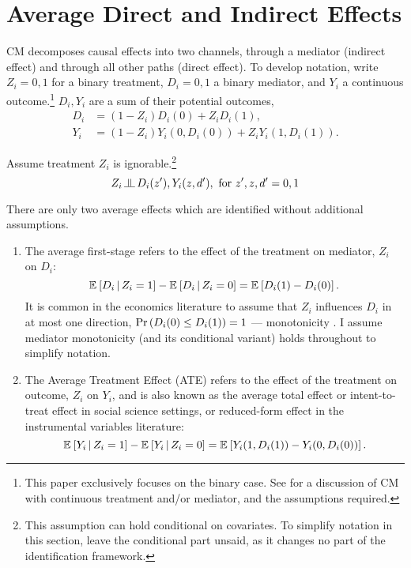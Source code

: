 \section{Average Direct and Indirect Effects}
\label{sec:mediation}
CM decomposes causal effects into two channels, through a mediator (indirect effect) and through all other paths (direct effect).
To develop notation, write $Z_i = 0, 1$ for a binary treatment, $D_i = 0, 1$ a binary mediator, and $Y_i$ a continuous outcome.\footnote{
    This paper exclusively focuses on the binary case.
    See \cite{huber2020direct} for a discussion of CM with continuous treatment and/or mediator, and the assumptions required.
}
$D_i, Y_i$ are a sum of their potential outcomes,
\begin{align*}
    D_i &= (1 - Z_i) D_i(0)
        +   Z_i      D_i(1),  \\
    Y_i &= (1 - Z_i) Y_i(0, D_i(0))
        +   Z_i      Y_i(1, D_i(1)).
\end{align*}

Assume treatment $Z_i$ is ignorable.\footnote{
    This assumption can hold conditional on covariates.
    To simplify notation in this section, leave the conditional part unsaid, as it changes no part of the identification framework.
}
\[ Z_i \indep  D_i(z'), Y_i(z, d'), \text{ for } z', z, d' = 0, 1 \]

There are only two average effects which are identified without additional assumptions.
\begin{enumerate}
    \item The average first-stage refers to the effect of the treatment on mediator, $Z_i$ on $D_i$:
    \[ \mathbb{E}_{} \left[ D_i \, \middle\vert \, Z_i = 1 \right] - \mathbb{E}_{} \left[ D_i \, \middle\vert \, Z_i = 0 \right]
        = \mathbb{E}_{} \left[ D_i(1) - D_i(0) \right]. \]
    It is common in the economics literature to assume that $Z_i$ influences $D_i$ in at most one direction, $\Pr\left( D_i(0) \leq D_i(1) \right) = 1$ --- monotonicity \citep{imbens1994identification}.
    I assume mediator monotonicity (and its conditional variant) holds throughout to simplify notation.
    \item The Average Treatment Effect (ATE) refers to the effect of the treatment on outcome, $Z_i$ on $Y_i$, and is also known as the average total effect or intent-to-treat effect in social science settings, or reduced-form effect in the instrumental variables literature:
    \[ \mathbb{E}_{} \left[ Y_i \, \middle\vert \, Z_i = 1 \right] - \mathbb{E}_{} \left[ Y_i \, \middle\vert \, Z_i = 0 \right]
        = \mathbb{E}_{} \left[ Y_i(1, D_i(1)) - Y_i(0, D_i(0)) \right]. \]
\end{enumerate}

